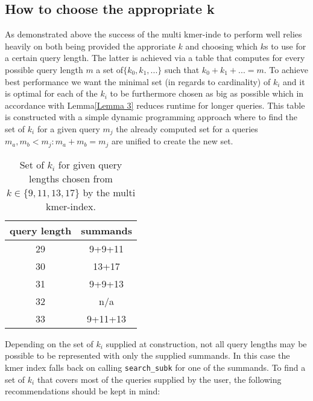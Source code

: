 \subsection{How to choose the appropriate k}
As demonstrated above the success of the multi kmer-inde to perform well relies heavily on both being provided the
approriate $k$ and choosing which $k$s to use for a certain query length. The latter is achieved
via a table that computes for every possible query length $m$ a set of$\{k_{0},k_{1},...\}$
such that $k_{0}+k_{1}+...=m$. To achieve best performance we want
the minimal set (in regards to cardinality) of $k_{i}$ and it is optimal for each of the $k_{i}$ to be furthermore chosen
as big as possible which in accordance with Lemma\ref{Lemma 3} reduces runtime for longer queries. This table is constructed with a simple
dynamic programming approach where to find the set of $k_{i}$ for a given query $m_{j}$ the already computed
set for a queries $m_{a},m_{b}<m_{j}:m_{a}+m_{b}=m_{j}$ are unified to create the new set.

\begin{table}[H]
\centering{}\caption{Set of $k_{i}$ for given query lengths chosen from $k\in\{9,11,13,17\}$
by the multi kmer-index.}
\begin{tabular}{cc}
\toprule
query length & summands\tabularnewline
\midrule
\midrule
29 & 9+9+11\tabularnewline
\midrule
30 & 13+17\tabularnewline
\midrule
31 & 9+9+13\tabularnewline
\midrule
32 & n/a\tabularnewline
\midrule
33 & 9+11+13\tabularnewline
\bottomrule
\end{tabular}
\end{table}

Depending on the set of $k_{i}$ supplied at construction, not all query lengths may
be possible to be represented with only the supplied summands. In this
case the kmer index falls back on calling \lstinline{search_subk}
for one of the summands.\pagebreak\newline
To find a set of $k_{i}$ that covers most
of the queries supplied by the user, the following recommendations
should be kept in mind:

